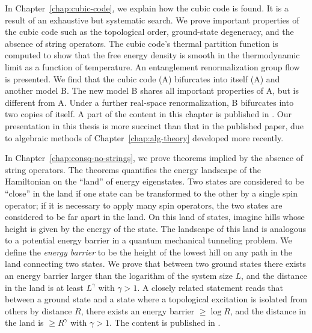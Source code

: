 In Chapter~\ref{chap:cubic-code}, we explain how the cubic code is found. It is a result of an exhaustive but systematic search. We prove important properties of the cubic code such as the topological order, ground-state degeneracy, and the absence of string operators. The cubic code's thermal partition function is computed to show that the free energy density is smooth in the thermodynamic limit as a function of temperature. An entanglement renormalization group flow is presented. We find that the cubic code (A) bifurcates into itself (A) and another model B. The new model B shares all important properties of A, but is different from A. Under a further real-space renormalization, B bifurcates into two copies of itself. 
A part of the content in this chapter is published in \cite{Haah2011Local}. Our presentation in this thesis is more succinct than that in the published paper, due to algebraic methods of Chapter~\ref{chap:alg-theory} developed more recently.


In Chapter~\ref{chap:consq-no-strings}, we prove theorems implied by the absence of string operators. The theorems quantifies the energy landscape of the Hamiltonian on the ``land'' of energy eigenstates. Two states are considered to be ``close'' in the land if one state can be transformed to the other by a single spin operator; if it is necessary to apply many spin operators, the two states are considered to be far apart in the land. On this land of states, imagine hills whose height is given by the energy of the state. The landscape of this land is analogous to a potential energy barrier in a quantum mechanical tunneling problem. We define the {\em energy barrier} to be the height of the lowest hill on any path in the land connecting two states. We prove that between two ground states there exists an energy barrier larger than the logarithm of the system size $L$, and the distance in the land is at least $L^\gamma$ with $\gamma > 1$. A closely related statement reads that between a ground state and a state where a topological excitation is isolated from others by distance $R$, there exists an energy barrier $\ge \log R$, and the distance in the land is $\ge R^\gamma$ with $\gamma >1$.
The content is published in \cite{BravyiHaah2011Energy}.


